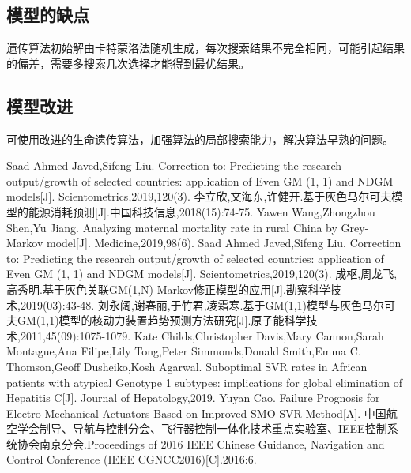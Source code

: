 \documentclass{whutmod}
\begin{document}
	\subsection{模型的缺点}
	
	遗传算法初始解由卡特蒙洛法随机生成，每次搜索结果不完全相同，可能引起结果的偏差，需要多搜索几次选择才能得到最优结果。
	\subsection{模型改进}
	可使用改进的生命遗传算法，加强算法的局部搜索能力，解决算法早熟的问题。

 
	\newpage	%
	\nocite{*}		%
%
%	
\begin{thebibliography}{9}%
	Saad Ahmed Javed,Sifeng Liu. Correction to: Predicting the research output/growth of selected countries: application of Even GM (1, 1) and NDGM models[J]. Scientometrics,2019,120(3).
	李立欣,文海东,许健开.基于灰色马尔可夫模型的能源消耗预测[J].中国科技信息,2018(15):74-75.	
	Yawen Wang,Zhongzhou Shen,Yu Jiang. Analyzing maternal mortality rate in rural China by Grey-Markov model[J]. Medicine,2019,98(6).
	Saad Ahmed Javed,Sifeng Liu. Correction to: Predicting the research output/growth of selected countries: application of Even GM (1, 1) and NDGM models[J]. Scientometrics,2019,120(3).
	成枢,周龙飞,高秀明.基于灰色关联GM(1,N)-Markov修正模型的应用[J].勘察科学技术,2019(03):43-48.
	刘永阔,谢春丽,于竹君,凌霜寒.基于GM(1,1)模型与灰色马尔可夫GM(1,1)模型的核动力装置趋势预测方法研究[J].原子能科学技术,2011,45(09):1075-1079.
	Kate Childs,Christopher Davis,Mary Cannon,Sarah Montague,Ana Filipe,Lily Tong,Peter Simmonds,Donald Smith,Emma C. Thomson,Geoff Dusheiko,Kosh Agarwal. Suboptimal SVR rates in African patients with atypical Genotype 1 subtypes: implications for global elimination of Hepatitis C[J]. Journal of Hepatology,2019.
	Yuyan Cao. Failure Prognosis for Electro-Mechanical Actuators Based on Improved SMO-SVR Method[A]. 中国航空学会制导、导航与控制分会、飞行器控制一体化技术重点实验室、IEEE控制系统协会南京分会.Proceedings of 2016 IEEE Chinese Guidance, Navigation and Control Conference (IEEE CGNCC2016)[C].2016:6.
\end{thebibliography}
\end{document}

